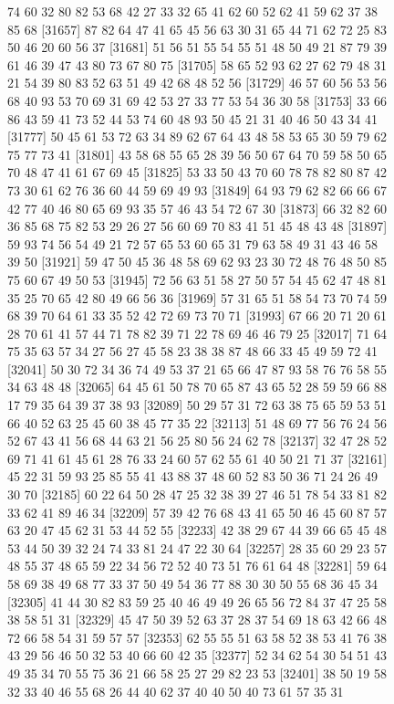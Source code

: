 \documentclass{article}
\begin{document}
\begin{figure}[H]
\begin{Schunk}
\begin{Soutput}
[31633] 74 60 32 80 82 53 68 42 27 33 32 65 41 62 60 52 62 41 59 62 37 38 85 68
[31657] 87 82 64 47 41 65 45 56 63 30 31 65 44 71 62 72 25 83 50 46 20 60 56 37
[31681] 51 56 51 55 54 55 51 48 50 49 21 87 79 39 61 46 39 47 43 80 73 67 80 75
[31705] 58 65 52 93 62 27 62 79 48 31 21 54 39 80 83 52 63 51 49 42 68 48 52 56
[31729] 46 57 60 56 53 56 68 40 93 53 70 69 31 69 42 53 27 33 77 53 54 36 30 58
[31753] 33 66 86 43 59 41 73 52 44 53 74 60 48 93 50 45 21 31 40 46 50 43 34 41
[31777] 50 45 61 53 72 63 34 89 62 67 64 43 48 58 53 65 30 59 79 62 75 77 73 41
[31801] 43 58 68 55 65 28 39 56 50 67 64 70 59 58 50 65 70 48 47 41 61 67 69 45
[31825] 53 33 50 43 70 60 78 78 82 80 87 42 73 30 61 62 76 36 60 44 59 69 49 93
[31849] 64 93 79 62 82 66 66 67 42 77 40 46 80 65 69 93 35 57 46 43 54 72 67 30
[31873] 66 32 82 60 36 85 68 75 82 53 29 26 27 56 60 69 70 83 41 51 45 48 43 48
[31897] 59 93 74 56 54 49 21 72 57 65 53 60 65 31 79 63 58 49 31 43 46 58 39 50
[31921] 59 47 50 45 36 48 58 69 62 93 23 30 72 48 76 48 50 85 75 60 67 49 50 53
[31945] 72 56 63 51 58 27 50 57 54 45 62 47 48 81 35 25 70 65 42 80 49 66 56 36
[31969] 57 31 65 51 58 54 73 70 74 59 68 39 70 64 61 33 35 52 42 72 69 73 70 71
[31993] 67 66 20 71 20 61 28 70 61 41 57 44 71 78 82 39 71 22 78 69 46 46 79 25
[32017] 71 64 75 35 63 57 34 27 56 27 45 58 23 38 38 87 48 66 33 45 49 59 72 41
[32041] 50 30 72 34 36 74 49 53 37 21 65 66 47 87 93 58 76 76 58 55 34 63 48 48
[32065] 64 45 61 50 78 70 65 87 43 65 52 28 59 59 66 88 17 79 35 64 39 37 38 93
[32089] 50 29 57 31 72 63 38 75 65 59 53 51 66 40 52 63 25 45 60 38 45 77 35 22
[32113] 51 48 69 77 56 76 24 56 52 67 43 41 56 68 44 63 21 56 25 80 56 24 62 78
[32137] 32 47 28 52 69 71 41 61 45 61 28 76 33 24 60 57 62 55 61 40 50 21 71 37
[32161] 45 22 31 59 93 25 85 55 41 43 88 37 48 60 52 83 50 36 71 24 26 49 30 70
[32185] 60 22 64 50 28 47 25 32 38 39 27 46 51 78 54 33 81 82 33 62 41 89 46 34
[32209] 57 39 42 76 68 43 41 65 50 46 45 60 87 57 63 20 47 45 62 31 53 44 52 55
[32233] 42 38 29 67 44 39 66 65 45 48 53 44 50 39 32 24 74 33 81 24 47 22 30 64
[32257] 28 35 60 29 23 57 48 55 37 48 65 59 22 34 56 72 52 40 73 51 76 61 64 48
[32281] 59 64 58 69 38 49 68 77 33 37 50 49 54 36 77 88 30 30 50 55 68 36 45 34
[32305] 41 44 30 82 83 59 25 40 46 49 49 26 65 56 72 84 37 47 25 58 38 58 51 31
[32329] 45 47 50 39 52 63 37 28 37 54 69 18 63 42 66 48 72 66 58 54 31 59 57 57
[32353] 62 55 55 51 63 58 52 38 53 41 76 38 43 29 56 46 50 32 53 40 66 60 42 35
[32377] 52 34 62 54 30 54 51 43 49 35 34 70 55 75 36 21 66 58 25 27 29 82 23 53
[32401] 38 50 19 58 32 33 40 46 55 68 26 44 40 62 37 40 40 50 40 73 61 57 35 31

\end{Soutput}
\end{Schunk}
\end{figure}
\end{document}
